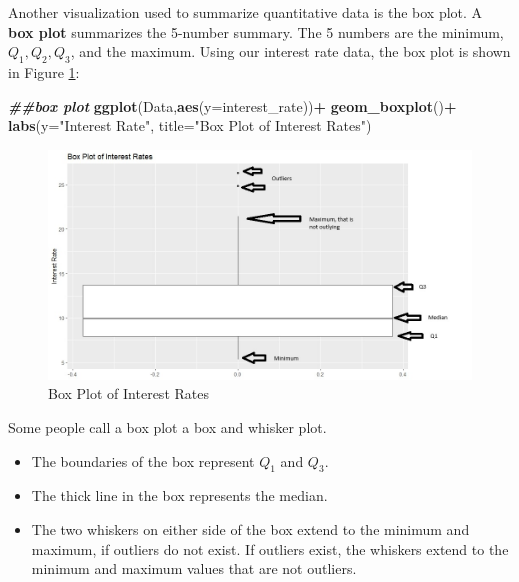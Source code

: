 \documentclass[
]{book}
\newenvironment{Shaded}{\begin{snugshade}}{\end{snugshade}}
\newcommand{\AttributeTok}[1]{\textcolor[rgb]{0.13,0.29,0.53}{#1}}
\newcommand{\DocumentationTok}[1]{\textcolor[rgb]{0.56,0.35,0.01}{\textbf{\textit{#1}}}}
\newcommand{\FunctionTok}[1]{\textcolor[rgb]{0.13,0.29,0.53}{\textbf{#1}}}
\newcommand{\NormalTok}[1]{#1}
\newcommand{\SpecialCharTok}[1]{\textcolor[rgb]{0.81,0.36,0.00}{\textbf{#1}}}
\newcommand{\StringTok}[1]{\textcolor[rgb]{0.31,0.60,0.02}{#1}}
\providecommand{\tightlist}{%
  \setlength{\itemsep}{0pt}\setlength{\parskip}{0pt}}
\begin{document}
Another visualization used to summarize quantitative data is the box plot. A \textbf{box plot} summarizes the 5-number summary. The 5 numbers are the minimum, \(Q_1, Q_2, Q_3\), and the maximum. Using our interest rate data, the box plot is shown in Figure \ref{fig:boxplot}:

\begin{Shaded}
\begin{Highlighting}[]
\DocumentationTok{\#\#box plot}
\FunctionTok{ggplot}\NormalTok{(Data,}\FunctionTok{aes}\NormalTok{(}\AttributeTok{y=}\NormalTok{interest\_rate))}\SpecialCharTok{+}
  \FunctionTok{geom\_boxplot}\NormalTok{()}\SpecialCharTok{+}
  \FunctionTok{labs}\NormalTok{(}\AttributeTok{y=}\StringTok{"Interest Rate"}\NormalTok{, }\AttributeTok{title=}\StringTok{"Box Plot of Interest Rates"}\NormalTok{)}
\end{Highlighting}
\end{Shaded}

\begin{figure}
\centering
\includegraphics{images/01-boxplot.jpeg}
\caption{\label{fig:boxplot}Box Plot of Interest Rates}
\end{figure}

Some people call a box plot a box and whisker plot.

\begin{itemize}
\tightlist
\item
  The boundaries of the box represent \(Q_1\) and \(Q_3\).
\item
  The thick line in the box represents the median.
\item
  The two whiskers on either side of the box extend to the minimum and maximum, if outliers do not exist. If outliers exist, the whiskers extend to the minimum and maximum values that are not outliers.
\end{itemize}
\end{document}

